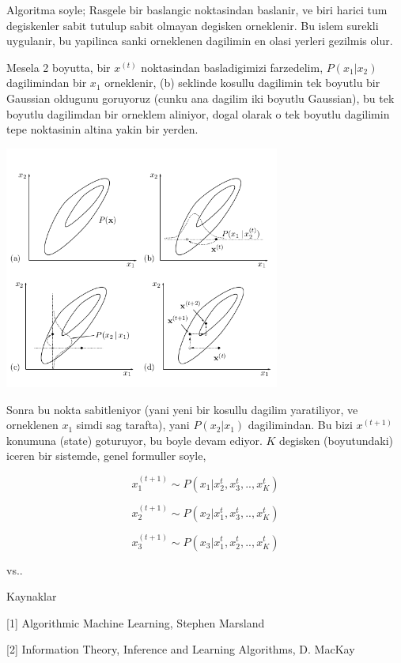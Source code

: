 \documentclass[12pt,fleqn]{article}\usepackage{../common}
\begin{document}
Algoritma soyle; Rasgele bir baslangic noktasindan baslanir, ve biri harici
tum degiskenler sabit tutulup sabit olmayan degisken orneklenir. Bu islem
surekli uygulanir, bu yapilinca sanki orneklenen dagilimin en olasi yerleri
gezilmis olur. 

Mesela 2 boyutta, bir $x^{(t)}$ noktasindan basladigimizi farzedelim,
$P(x_1|x_2)$ dagilimindan bir $x_1$ orneklenir, (b) seklinde kosullu
dagilimin tek boyutlu bir Gaussian oldugunu goruyoruz (cunku ana dagilim
iki boyutlu Gaussian), bu tek boyutlu dagilimdan bir orneklem aliniyor,
dogal olarak o tek boyutlu dagilimin tepe noktasinin altina yakin bir
yerden.


\includegraphics[height=8cm]{gibbs.png}

Sonra bu nokta sabitleniyor (yani yeni bir kosullu dagilim yaratiliyor, ve
orneklenen $x_1$ simdi sag tarafta), yani $P(x_2|x_1)$ dagilimindan. Bu
bizi $x^{(t+1)}$ konumuna (state) goturuyor, bu boyle devam ediyor. $K$
degisken (boyutundaki) iceren bir sistemde, genel formuller soyle,

$$ x_1^{(t+1)} \sim P(x_1 | x_2^{t},x_3^{t},..,x_K^{t}) $$ 

$$ x_2^{(t+1)} \sim P(x_2 | x_1^{t},x_3^{t},..,x_K^{t}) $$ 

$$ x_3^{(t+1)} \sim P(x_3 | x_1^{t},x_2^{t},..,x_K^{t}) $$ 

vs..



Kaynaklar

[1] Algorithmic Machine Learning, Stephen Marsland

[2] Information Theory, Inference and Learning Algorithms, D. MacKay
\end{document}
